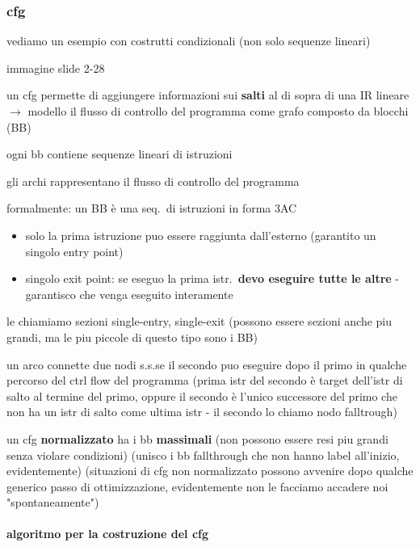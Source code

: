 \subsubsection{cfg}

vediamo un esempio con costrutti condizionali (non solo sequenze lineari)

immagine slide 2-28

un cfg permette di aggiungere informazioni sui \textbf{salti} al di sopra di una IR lineare $\rightarrow$ modello il flusso di controllo del programma come grafo composto da blocchi (BB)

ogni bb contiene sequenze lineari di istruzioni

gli archi rappresentano il flusso di controllo del programma


formalmente: un BB \`e una seq.~di istruzioni in forma 3AC
\begin{itemize}
  \item solo la prima istruzione puo essere raggiunta dall'esterno (garantito un singolo entry point)
  \item singolo exit point: se eseguo la prima istr.~\textbf{devo eseguire tutte le altre} - garantisco che venga eseguito interamente
\end{itemize}

le chiamiamo sezioni single-entry, single-exit (possono essere sezioni anche piu grandi, ma le piu piccole di questo tipo sono i BB)

un arco connette due nodi s.s.se il secondo puo eseguire dopo il primo in qualche percorso del ctrl flow del programma (prima istr del secondo \`e target dell'istr di salto al termine del primo, oppure il secondo \`e l'unico successore del primo che non ha un istr di salto come ultima istr - il secondo lo chiamo nodo falltrough)

un cfg \textbf{normalizzato} ha i bb \textbf{massimali} (non possono essere resi piu grandi senza violare condizioni) (unisco i bb fallthrough che non hanno label all'inizio, evidentemente) (situazioni di cfg non normalizzato possono avvenire dopo qualche generico passo di ottimizzazione, evidentemente non le facciamo accadere noi "spontaneamente")

\paragraph{algoritmo per la costruzione del cfg}~\\

